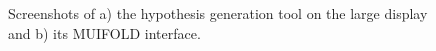 \begin{figure}
\begin{subfigure}[b]{.2\linewidth}
    \end{subfigure}
    \caption{Screenshots of a) the hypothesis generation tool on the large display and b) its MUIFOLD interface.}
    \label{fig:key_driver_tool}
\end{figure}